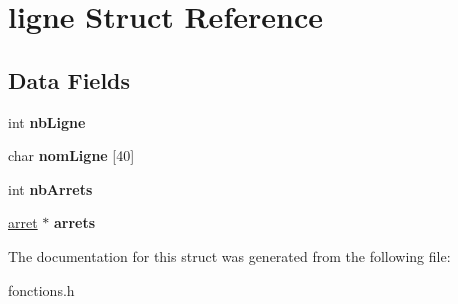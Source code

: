 \hypertarget{structligne}{}\section{ligne Struct Reference}
\label{structligne}
\subsection*{Data Fields}
\begin{DoxyCompactItemize}
\item 
\mbox{\label{structligne_a8192a702a6a4af3dd9d5941d3975b974}} 
int {\bfseries nb\+Ligne}
\item 
\mbox{\label{structligne_a3eedebecf8b0c9779f85ad41cc55c683}} 
char {\bfseries nom\+Ligne} \mbox{[}40\mbox{]}
\item 
\mbox{\label{structligne_ae20961cfb632042b1a67c14c73ff548b}} 
int {\bfseries nb\+Arrets}
\item 
\mbox{\label{structligne_a461e985d0ebbfa39dd830d707a1ec142}} 
\hyperlink{structarret}{arret} $\ast$ {\bfseries arrets}
\end{DoxyCompactItemize}


The documentation for this struct was generated from the following file\+:\begin{DoxyCompactItemize}
\item 
fonctions.\+h\end{DoxyCompactItemize}
